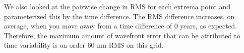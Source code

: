We also looked at the pairwise change in RMS for each extrema point and parameterized this by the time difference. The RMS difference increases, on average, when you move away from a time difference of 0 years, as expected. Therefore, the maximum amount of wavefront error that can be attributed to time variability is on order 60 nm RMS on this grid.
    
